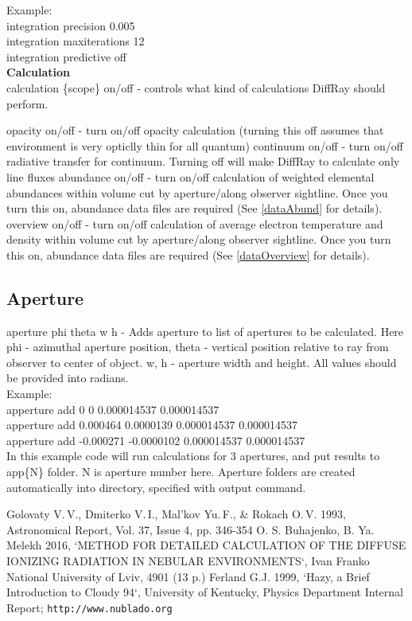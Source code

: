 \documentclass[a4paper]{article}
\begin{document}
Example:\\
integration precision 0.005\\
integration maxiterations 12\\
integration predictive off\\

{\bf Calculation}\\
calculation \{scope\} on/off - controls what kind of calculations DiffRay should perform.

opacity on/off - turn on/off opacity calculation (turning this off assumes that environment is very opticlly thin for all
quantum)
continuum on/off - turn on/off radiative transfer for continuum. Turning off will make DiffRay to calculate only line fluxes
abundance on/off - turn on/off calculation of weighted elemental abundances within volume cut by aperture/along observer sightline. Once you turn this on,
abundance data files are required (See \ref{dataAbund} for details).
overview on/off - turn on/off calculation of average electron temperature and density within volume cut by aperture/along observer sightline. Once you turn this on,
abundance data files are required (See \ref{dataOverview} for details).


\subsection{Aperture}

aperture phi theta w h - Adds aperture to list of apertures to be calculated. 
Here phi - azimuthal aperture position, theta - vertical position relative to ray
from observer to center of object. w, h - aperture width and height. All values
should be provided into radians.\\

Example:\\
apperture add 0 0 0.000014537 0.000014537\\
apperture add 0.000464 0.0000139 0.000014537 0.000014537\\
apperture add -0.000271 -0.0000102 0.000014537 0.000014537\\
In this example code will run calculations for 3 apertures, and put results to 
app\{N\} folder. N is aperture number here. Aperture folders are created automatically
into directory, specified with output command.



\begin{thebibliography}{3}
{\small
{} Golovaty V.\,V., Dmiterko V.\,I., Mal'kov Yu.\,F., \& Rokach O.\,V. 1993, Astronomical Report, Vol. 37, Issue 4, pp. 346-354
 O. S. Buhajenko, B. Ya. Melekh 2016, `METHOD FOR DETAILED CALCULATION OF THE DIFFUSE IONIZING RADIATION IN NEBULAR ENVIRONMENTS`, Ivan Franko National University of Lviv, 4901 (13 p.) 
 Ferland G.J. 1999, `Hazy, a Brief Introduction to Cloudy 94`, University of Kentucky, Physics Department Internal Report; \texttt{http://www.nublado.org}
}
\end{thebibliography}
\end{document}
